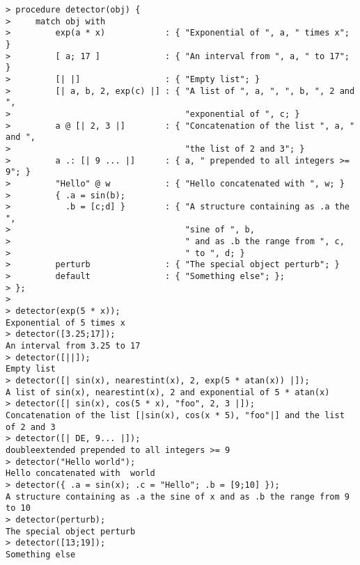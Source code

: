\begin{center}\begin{minipage}{15cm}\begin{Verbatim}[frame=single]
> procedure detector(obj) {
>     match obj with 
>         exp(a * x)            : { "Exponential of ", a, " times x"; }
>         [ a; 17 ]             : { "An interval from ", a, " to 17"; }
>         [| |]                 : { "Empty list"; }
>         [| a, b, 2, exp(c) |] : { "A list of ", a, ", ", b, ", 2 and ",
>                                   "exponential of ", c; }
>         a @ [| 2, 3 |]        : { "Concatenation of the list ", a, " and ",
>                                   "the list of 2 and 3"; }
>         a .: [| 9 ... |]      : { a, " prepended to all integers >= 9"; }
>         "Hello" @ w           : { "Hello concatenated with ", w; }
>         { .a = sin(b); 
>           .b = [c;d] }        : { "A structure containing as .a the ",
>                                   "sine of ", b,
>                                   " and as .b the range from ", c, 
>                                   " to ", d; }
>         perturb               : { "The special object perturb"; }
>         default               : { "Something else"; };
> };
> 
> detector(exp(5 * x));
Exponential of 5 times x
> detector([3.25;17]);
An interval from 3.25 to 17
> detector([||]);
Empty list
> detector([| sin(x), nearestint(x), 2, exp(5 * atan(x)) |]);
A list of sin(x), nearestint(x), 2 and exponential of 5 * atan(x)
> detector([| sin(x), cos(5 * x), "foo", 2, 3 |]);
Concatenation of the list [|sin(x), cos(x * 5), "foo"|] and the list of 2 and 3
> detector([| DE, 9... |]);
doubleextended prepended to all integers >= 9
> detector("Hello world");
Hello concatenated with  world
> detector({ .a = sin(x); .c = "Hello"; .b = [9;10] });
A structure containing as .a the sine of x and as .b the range from 9 to 10
> detector(perturb);
The special object perturb
> detector([13;19]);
Something else
\end{Verbatim}
\end{minipage}\end{center}

